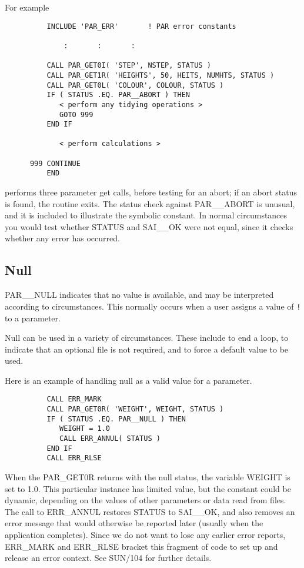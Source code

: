 \documentclass[twoside,11pt]{article}
\newcommand{\xref}[3]{#1}
\newcommand{\xlabel}[1]{}
\begin{document}
For example
\begin{verbatim}
          INCLUDE 'PAR_ERR'       ! PAR error constants

              :       :       :

          CALL PAR_GET0I( 'STEP', NSTEP, STATUS )
          CALL PAR_GET1R( 'HEIGHTS', 50, HEITS, NUMHTS, STATUS )
          CALL PAR_GET0L( 'COLOUR', COLOUR, STATUS )
          IF ( STATUS .EQ. PAR__ABORT ) THEN
             < perform any tidying operations >
             GOTO 999
          END IF

             < perform calculations >

      999 CONTINUE
          END

\end{verbatim}
performs three parameter get calls, before testing for an
abort; if an abort status is found, the routine exits.  The status check
against PAR\_\_ABORT is unusual, and it is included to illustrate the
symbolic constant.  In normal circumstances you would test whether
STATUS and SAI\_\_OK were not equal, since it checks whether any error
has occurred. 

\subsection{\xlabel{null}Null}

PAR\_\_NULL indicates that no value is available, and may be interpreted
according to circumstances.  This normally occurs when a user assigns a
value of {\tt !} to a parameter. 

Null can be used in a variety of circumstances.  These include to 
end a loop, to indicate that an optional file is not required, and to
force a default value to be used. 

Here is an example of handling null as a valid value for a parameter.

\begin{verbatim}
          CALL ERR_MARK
          CALL PAR_GET0R( 'WEIGHT', WEIGHT, STATUS )
          IF ( STATUS .EQ. PAR__NULL ) THEN
             WEIGHT = 1.0
             CALL ERR_ANNUL( STATUS )
          END IF
          CALL ERR_RLSE
\end{verbatim}

When the PAR\_GET0R returns with the null status, the variable WEIGHT is
set to 1.0.  This particular instance has limited value, but the
constant could be dynamic, depending on the values of other parameters
or data read from files.  The call to ERR\_ANNUL restores STATUS to
SAI\_\_OK, and also removes an error message that would otherwise be
reported later (usually when the application completes).  Since we do
not want to lose any earlier error reports, ERR\_MARK and ERR\_RLSE
bracket this fragment of code to set up and release an error context. 
See 
\xref{SUN/104}{sun104}{}
for further details. 
\end{document}
